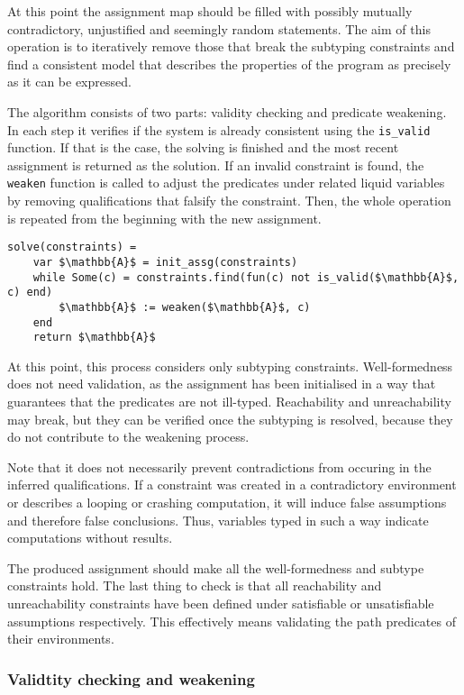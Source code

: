 At this point the assignment map should be filled with possibly mutually
contradictory, unjustified and seemingly random statements. The aim of this
operation is to iteratively remove those that break the subtyping constraints
and find a consistent model that describes the properties of the program as
precisely as it can be expressed.

The algorithm consists of two parts: validity checking and predicate weakening.
In each step it verifies if the system is already consistent using the
\texttt{is\_valid} function. If that is the case, the solving is finished and
the most recent assignment is returned as the solution. If an invalid constraint
is found, the \texttt{weaken} function is called to adjust the predicates under
related liquid variables by removing qualifications that falsify the constraint.
Then, the whole operation is repeated from the beginning with the new
assignment.

\begin{lstlisting}[language=pseudocode]
solve(constraints) =
    var $\mathbb{A}$ = init_assg(constraints)
    while Some(c) = constraints.find(fun(c) not is_valid($\mathbb{A}$, c) end)
        $\mathbb{A}$ := weaken($\mathbb{A}$, c)
    end
    return $\mathbb{A}$
\end{lstlisting}

At this point, this process considers only subtyping constraints.
Well-formedness does not need validation, as the assignment has been initialised
in a way that guarantees that the predicates are not ill-typed. Reachability and
unreachability may break, but they can be verified once the subtyping is
resolved, because they do not contribute to the weakening process.

Note that it does not necessarily prevent contradictions from occuring in the
inferred qualifications. If a constraint was created in a contradictory
environment or describes a looping or crashing computation, it will induce false
assumptions and therefore false conclusions. Thus, variables typed in such a way
indicate computations without results.

The produced assignment should make all the well-formedness and subtype
constraints hold. The last thing to check is that all reachability and
unreachability constraints have been defined under satisfiable or unsatisfiable
assumptions respectively. This effectively means validating the path predicates
of their environments.

\subsubsection{Validtity checking and weakening}

